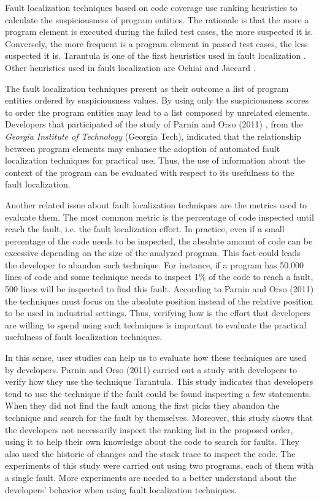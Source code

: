\documentclass[12pt,a4paper,espaco=umemeio,noindentfirst,oneside,openany,tocpage=plain,pnumromarab,ruledheader,time,anapcustomindent]{sty/abnt}
\begin{document}
Fault localization techniques based on code coverage use ranking heuristics to calculate the suspiciousness of program entities.
The rationale is that the more a program element is executed during the failed test cases, the more suspected  it is. Conversely, 
the more frequent is a program element in passed test cases, the less suspected it is. Tarantula is one of the first heuristics 
used in fault localization \cite{jones2002}. Other heuristics used in fault localization are Ochiai and Jaccard \cite{abreu2007}.

The fault localization techniques present as their outcome a list of program entities ordered by suspiciousness values. By using 
only the suspiciousness scores to order the program entities may lead to a list composed by unrelated elements. Developers that 
participated of the study of Parnin and Orso (2011) \cite{parnin2011}, from the \textit{Georgia  Institute of Technology} (Georgia Tech), indicated that the 
relationship between program elements may enhance the adoption of automated fault localization techniques for practical use.
Thus, the use of information about the context of the program can be evaluated with respect to its usefulness to the fault 
localization.

Another related issue about fault localization techniques are the metrics used to evaluate them. The most common metric is the 
percentage of code inspected until reach the fault, i.e. the fault localization effort. In practice, even if a small percentage 
of the code needs to be inspected, the absolute amount of code can be excessive depending on the size of the analyzed program. This fact 
could leads the developer to abandon such technique. For instance, if a program has 50.000 lines of code and some technique 
needs to inspect 1\% of the code to reach a fault, 500 lines will be inspected to find this fault. According to Parnin and Orso (2011)
\cite{parnin2011} the techniques must focus on the absolute position instead of the relative position to be used in industrial settings.
Thus, verifying how is the effort that developers are willing to spend using such techniques is important to evaluate the practical 
usefulness of fault localization techniques.

In this sense, user studies can help us to evaluate how these techniques are used by developers. Parnin and Orso (2011) \cite{parnin2011} 
carried out a study with developers to verify how they use the technique Tarantula. This study indicates that developers tend to 
use the technique if the fault could be found inspecting a few statements. When they did not find the fault among the first picks 
they abandon the technique and search for the fault by themselves. Moreover, this study shows that the developers not necessarily 
inspect the ranking list in the proposed order, using it to help their own knowledge about the code to search for faults. They also used
the historic of changes and the stack trace to inspect the code.
The experiments of this study were carried out using two programs, each of them with a single fault. More experiments are needed to 
a better understand about the developers' behavior when using fault localization techniques. 
\end{document}
